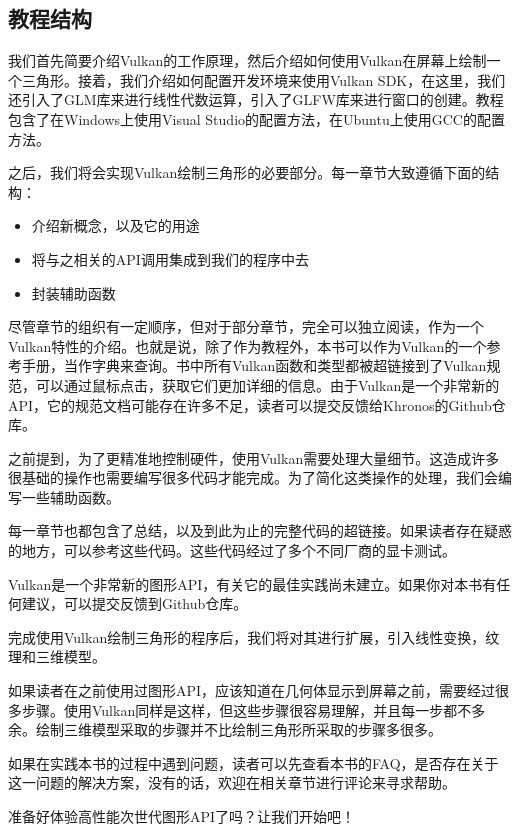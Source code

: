 \subsection{教程结构}

我们首先简要介绍Vulkan的工作原理，然后介绍如何使用Vulkan在屏幕上绘制一个三角形。接着，我们介绍如何配置开发环境来使用Vulkan SDK，在这里，我们还引入了GLM库来进行线性代数运算，引入了GLFW库来进行窗口的创建。教程包含了在Windows上使用Visual Studio的配置方法，在Ubuntu上使用GCC的配置方法。

之后，我们将会实现Vulkan绘制三角形的必要部分。每一章节大致遵循下面的结构：

\begin{itemize}
	\item 介绍新概念，以及它的用途
	\item 将与之相关的API调用集成到我们的程序中去
	\item 封装辅助函数
\end{itemize}

尽管章节的组织有一定顺序，但对于部分章节，完全可以独立阅读，作为一个Vulkan特性的介绍。也就是说，除了作为教程外，本书可以作为Vulkan的一个参考手册，当作字典来查询。书中所有Vulkan函数和类型都被超链接到了Vulkan规范，可以通过鼠标点击，获取它们更加详细的信息。由于Vulkan是一个非常新的API，它的规范文档可能存在许多不足，读者可以提交反馈给Khronos的Github仓库。

之前提到，为了更精准地控制硬件，使用Vulkan需要处理大量细节。这造成许多很基础的操作也需要编写很多代码才能完成。为了简化这类操作的处理，我们会编写一些辅助函数。

每一章节也都包含了总结，以及到此为止的完整代码的超链接。如果读者存在疑惑的地方，可以参考这些代码。这些代码经过了多个不同厂商的显卡测试。

Vulkan是一个非常新的图形API，有关它的最佳实践尚未建立。如果你对本书有任何建议，可以提交反馈到Github仓库。

完成使用Vulkan绘制三角形的程序后，我们将对其进行扩展，引入线性变换，纹理和三维模型。

如果读者在之前使用过图形API，应该知道在几何体显示到屏幕之前，需要经过很多步骤。使用Vulkan同样是这样，但这些步骤很容易理解，并且每一步都不多余。绘制三维模型采取的步骤并不比绘制三角形所采取的步骤多很多。

如果在实践本书的过程中遇到问题，读者可以先查看本书的FAQ，是否存在关于这一问题的解决方案，没有的话，欢迎在相关章节进行评论来寻求帮助。

准备好体验高性能次世代图形API了吗？让我们开始吧！

\newpage
